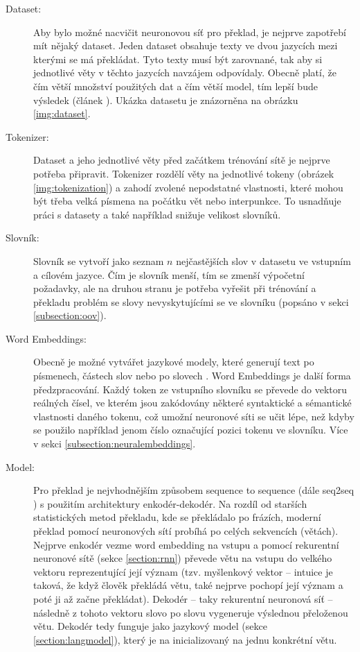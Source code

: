 \begin{description}
  \item[Dataset:] Aby bylo možné nacvičit neuronovou síť pro překlad, je nejprve zapotřebí mít nějaký dataset. Jeden dataset obsahuje texty ve dvou jazycích mezi kterými se má překládat. Tyto texty musí být zarovnané, tak aby si jednotlivé věty v těchto jazycích navzájem odpovídaly. Obecně platí, že čím větší množství použitých dat a čím větší model, tím lepší bude výsledek (článek \cite{googleLimits}). Ukázka datasetu je znázorněna na obrázku \ref{img:dataset}.

  \item[Tokenizer:] Dataset a jeho jednotlivé věty před začátkem trénování sítě je nejprve potřeba připravit. Tokenizer rozdělí věty na jednotlivé tokeny (obrázek \ref{img:tokenization}) a zahodí zvolené nepodstatné vlastnosti, které mohou být třeba velká písmena na počátku vět nebo interpunkce. To usnadňuje práci s datasety a také například snižuje velikost slovníků.

  \item[Slovník:] Slovník se vytvoří jako seznam $n$ nejčastějších slov v datasetu ve vstupním a cílovém jazyce. Čím je slovník menší, tím se zmenší výpočetní požadavky, ale na druhou stranu je potřeba vyřešit při trénování a překladu problém se slovy nevyskytujícími se ve slovníku (popsáno v sekci \ref{subsection:oov}).

  \item[Word Embeddings:] Obecně je možné vytvářet jazykové modely, které generují text po písmenech, částech slov nebo po slovech \cite{mikolovSubwords}. Word Embeddings je další forma předzpracování. Každý token ze vstupního slovníku se převede do vektoru reálných čísel, ve kterém jsou zakódovány některé syntaktické a sémantické vlastnosti daného tokenu, což umožní neuronové síti se učit lépe, než kdyby se použilo například jenom číslo označující pozici tokenu ve slovníku. Více v sekci \ref{subsection:neuralembeddings}.

  \item[Model:] Pro překlad je nejvhodnějším způsobem sequence to sequence (dále seq2seq \cite{seq2seq}) s použitím architektury enkodér-dekodér. Na rozdíl od starších statistických metod překladu, kde se překládalo po frázích, moderní překlad pomocí neuronových sítí probíhá po celých sekvencích (větách). Nejprve enkodér vezme word embedding na vstupu a pomocí rekurentní neuronové sítě (sekce \ref{section:rnn}) převede větu na vstupu do velkého vektoru reprezentující její význam (tzv. myšlenkový vektor -- intuice je taková, že když člověk překládá větu, také nejprve pochopí její význam a poté ji až začne překládat). Dekodér -- taky rekurentní neuronová síť -- následně z tohoto vektoru slovo po slovu vygeneruje výslednou přeloženou větu. Dekodér tedy funguje jako jazykový model (sekce \ref{section:langmodel}), který je na inicializovaný na jednu konkrétní větu.
\end{description}


